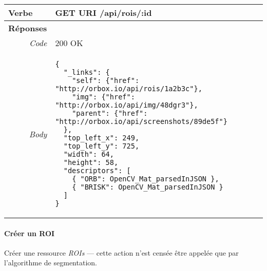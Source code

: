 \begin{appendices}
\begin{absolutelynopagebreak}
\begin{tabular}{@{}p{2cm}p{11.5cm}@{}}
    \toprule
    \textbf{Verbe}                        & GET \hspace{2.5cm} \textbf{URI} \hspace{0.25cm} /api/rois/:id   \\ \midrule
    \textbf{Réponses}                     &        \\
    \multicolumn{1}{r}{\textit{Code}}   & 200 OK \\
    \multicolumn{1}{r}{\textit{Body}}   & \begin{verbatim}
{
  "_links": {
    "self": {"href": "http://orbox.io/api/rois/1a2b3c"},
    "img": {"href": "http://orbox.io/api/img/48dgr3"},
    "parent": {"href": "http://orbox.io/api/screenshots/89de5f"}
  },
  "top_left_x": 249,
  "top_left_y": 725,
  "width": 64,
  "height": 58,
  "descriptors": [
    { "ORB": OpenCV_Mat_parsedInJSON }, 
    { "BRISK": OpenCV_Mat_parsedInJSON }
  ]
}
    \end{verbatim}
    \label{jsonHalROIs}
    \\ \bottomrule
\end{tabular}
\end{absolutelynopagebreak}

\begin{absolutelynopagebreak}
\paragraph{Créer un ROI}
Créer une ressource \emph{ROIs} --- cette action n'est censée être appelée que par l'algorithme de segmentation.


\end{absolutelynopagebreak}
\end{appendices}
